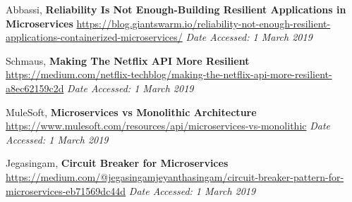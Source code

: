 \documentclass[12pt]{article}
\begin{document}
\begin{sloppypar}
{\footnotesize
\begin{thebibliography}{9}
   Abbassi, \textbf{  Reliability Is Not Enough-Building Resilient Applications in Microservices}
   \url{https://blog.giantswarm.io/reliability-not-enough-resilient-applications-containerized-microservices/}
   \textit{Date Accessed: 1 March 2019}

    Schmaus, \textbf{Making The Netflix API More Resilient}
    \url{https://medium.com/netflix-techblog/making-the-netflix-api-more-resilient-a8ec62159c2d}
    \textit{Date Accessed: 1 March 2019}
    
    MuleSoft, \textbf{Microservices vs Monolithic Architecture}
    \url{https://www.mulesoft.com/resources/api/microservices-vs-monolithic}
    \textit{Date Accessed: 1 March 2019}
    
    Jegasingam, \textbf{Circuit Breaker for Microservices}
    \url{https://medium.com/@jegasingamjeyanthasingam/circuit-breaker-pattern-for-microservices-eb71569dc44d}
    \textit{Date Accessed: 1 March 2019}
\end{thebibliography}
}


\end{sloppypar}
\end{document}
